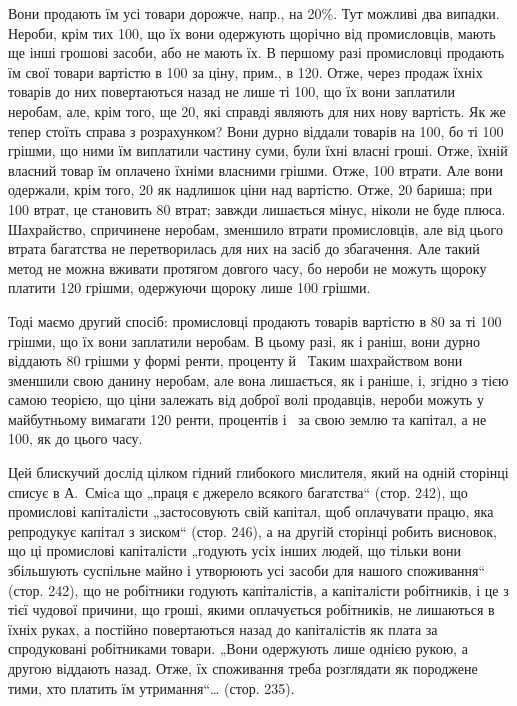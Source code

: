 \parcont{}  %
Вони продають їм усі товари дорожче, напр., на 20\%. Тут можливі два випадки. Нероби, крім
тих 100, що їх вони одержують щорічно від промисловців, мають ще інші грошові засоби, або
не мають їх. В першому разі промисловці продають їм свої товари вартістю в 100 за ціну,
прим., в 120. Отже, через продаж їхніх товарів до них повертаються назад не лише ті 100, що їх вони заплатили неробам, але, крім того, ще 20, які справді являють для них
нову вартість. Як же тепер стоїть справа з розрахунком? Вони дурно віддали товарів на 100,
бо ті 100 грішми, що ними їм виплатили частину суми, були їхні власні гроші. Отже, їхній
власний товар їм оплачено їхніми власними грішми. Отже, 100 втрати. Але вони одержали,
крім того, 20 як надлишок ціни над вартістю. Отже, 20 бариша; при 100
втрат, це становить 80 втрат; завжди лишається мінус, ніколи не буде плюса. Шахрайство,
спричинене неробам, зменшило втрати промисловців, але від цього втрата багатства не перетворилась
для них на засіб до збагачення. Але такий метод не можна вживати протягом довгого часу, бо нероби не
можуть щороку платити 120 грішми, одержуючи щороку лише 100 грішми.

Тоді маємо другий спосіб: промисловці продають товарів вартістю в 80 за ті 100
грішми, що їх вони заплатили неробам. В цьому разі, як і раніш, вони дурно віддають 80
грішми у формі ренти, проценту й~ Таким шахрайством вони зменшили свою данину неробам, але
вона лишається, як і раніше, і, згідно з тією самою теорією, що ціни залежать від доброї волі
продавців, нероби можуть у майбутньому вимагати 120 ренти, процентів і~ за свою
землю та капітал, а не 100, як до цього часу.

Цей блискучий дослід цілком гідний глибокого мислителя, який на одній сторінці списує в А.~Сміcа що
„праця є джерело всякого багатства“ (стор. 242), що промислові капіталісти „застосовують свій
капітал, щоб оплачувати працю, яка репродукує капітал з зиском“ (стор. 246), а на другій сторінці
робить висновок, що ці промислові капіталісти „годують
усіх інших людей, що тільки вони збільшують суспільне майно і утворюють усі засоби для нашого
споживання“ (стор. 242), що не робітники годують капіталістів, а капіталісти робітників, і це з тієї
чудової причини, що гроші, якими оплачується робітників, не лишаються в їхніх руках, а постійно
повертаються назад до капіталістів як плата за спродуковані робітниками товари. „Вони одержують лише
однією рукою, а другою віддають назад. Отже, їх споживання треба розглядати як породжене тими, хто
платить їм утримання“\dots{} (стор. 235).

